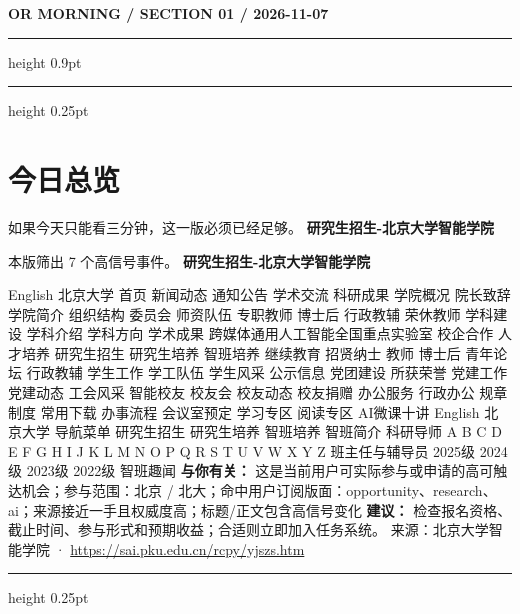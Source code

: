 \documentclass[10.5pt]{ctexart}
\begin{document}
{\small\bfseries OR MORNING / SECTION 01 / 2026-11-07}
\vspace{2mm}
\hrule height 0.9pt
\vspace{1.5mm}
\hrule height 0.25pt
\vspace{4mm}
\section*{今日总览}
{\color{ormuted} 如果今天只能看三分钟，这一版必须已经足够。}
\vspace{2mm}
{\fontsize{25}{29}\selectfont\bfseries 研究生招生-北京大学智能学院}\par
\vspace{2mm}
{\large 本版筛出 7 个高信号事件。}
\vspace{3mm}
{\Large\bfseries 研究生招生-北京大学智能学院}\par
English 北京大学 首页 新闻动态 通知公告 学术交流 科研成果 学院概况 院长致辞 学院简介 组织结构 委员会 师资队伍 专职教师 博士后 行政教辅 荣休教师 学科建设 学科介绍 学科方向 学术成果 跨媒体通用人工智能全国重点实验室 校企合作 人才培养 研究生招生 研究生培养 智班培养 继续教育 招贤纳士 教师 博士后 青年论坛 行政教辅 学生工作 学工队伍 学生风采 公示信息 党团建设 所获荣誉 党建工作 党建动态 工会风采 智能校友 校友会 校友动态 校友捐赠 办公服务 行政办公 规章制度 常用下载 办事流程 会议室预定 学习专区 阅读专区 AI微课十讲 English 北京大学 导航菜单 研究生招生 研究生培养 智班培养 智班简介 科研导师 A B C D E F G H I J K L M N O P Q R S T U V W X Y Z 班主任与辅导员 2025级 2024级 2023级 2022级 智班趣闻
\textbf{与你有关：} 这是当前用户可实际参与或申请的高可触达机会；参与范围：北京 / 北大；命中用户订阅版面：opportunity、research、ai；来源接近一手且权威度高；标题/正文包含高信号变化
\textbf{建议：} 检查报名资格、截止时间、参与形式和预期收益；合适则立即加入任务系统。
{\footnotesize\color{ormuted} 来源：北京大学智能学院 · \url{https://sai.pku.edu.cn/rcpy/yjszs.htm}}
\vspace{3mm}
\hrule height 0.25pt
\vspace{3mm}
\end{document}
